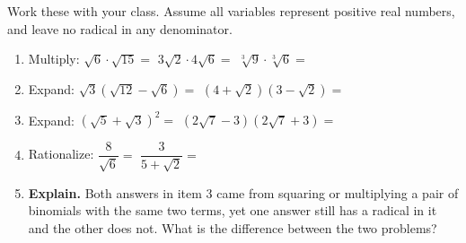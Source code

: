 \documentclass[10pt]{article}
\begin{document}
\begin{practicebox}
Work these with your class. Assume all variables represent positive real numbers, and leave no
radical in any denominator.
\begin{enumerate}[leftmargin=1.7em, itemsep=5pt]
  \item Multiply: \; $\sqrt{6}\cdot\sqrt{15}=$  \quad
        $3\sqrt2\cdot4\sqrt{6}=$  \quad $\sqrt[3]{9}\cdot\sqrt[3]{6}=$ 
  \item Expand: \; $\sqrt3\left(\sqrt{12}-\sqrt6\right)=$  \quad
        $\left(4+\sqrt2\right)\left(3-\sqrt2\right)=$ 
  \item Expand: \; $\left(\sqrt5+\sqrt3\right)^{2}=$  \quad
        $\left(2\sqrt7-3\right)\left(2\sqrt7+3\right)=$ 
  \item Rationalize: \; $\dfrac{8}{\sqrt6}=$  \quad
        $\dfrac{3}{5+\sqrt2}=$ 
  \item \textbf{Explain.} Both answers in item 3 came from squaring or multiplying a pair of
        binomials with the same two terms, yet one answer still has a radical in it and the other
        does not. What is the difference between the two problems? 
\end{enumerate}
\end{practicebox}
\end{document}
